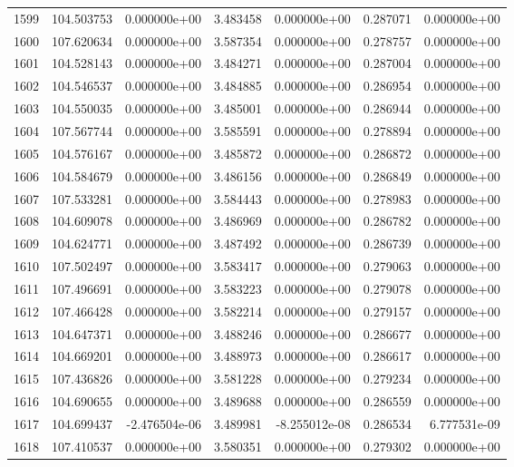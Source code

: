 \begin{tabular}{rrrrrrr}
1599 & 104.503753 &  0.000000e+00 &  3.483458 &  0.000000e+00 &    0.287071 &  0.000000e+00 \\
1600 & 107.620634 &  0.000000e+00 &  3.587354 &  0.000000e+00 &    0.278757 &  0.000000e+00 \\
1601 & 104.528143 &  0.000000e+00 &  3.484271 &  0.000000e+00 &    0.287004 &  0.000000e+00 \\
1602 & 104.546537 &  0.000000e+00 &  3.484885 &  0.000000e+00 &    0.286954 &  0.000000e+00 \\
1603 & 104.550035 &  0.000000e+00 &  3.485001 &  0.000000e+00 &    0.286944 &  0.000000e+00 \\
1604 & 107.567744 &  0.000000e+00 &  3.585591 &  0.000000e+00 &    0.278894 &  0.000000e+00 \\
1605 & 104.576167 &  0.000000e+00 &  3.485872 &  0.000000e+00 &    0.286872 &  0.000000e+00 \\
1606 & 104.584679 &  0.000000e+00 &  3.486156 &  0.000000e+00 &    0.286849 &  0.000000e+00 \\
1607 & 107.533281 &  0.000000e+00 &  3.584443 &  0.000000e+00 &    0.278983 &  0.000000e+00 \\
1608 & 104.609078 &  0.000000e+00 &  3.486969 &  0.000000e+00 &    0.286782 &  0.000000e+00 \\
1609 & 104.624771 &  0.000000e+00 &  3.487492 &  0.000000e+00 &    0.286739 &  0.000000e+00 \\
1610 & 107.502497 &  0.000000e+00 &  3.583417 &  0.000000e+00 &    0.279063 &  0.000000e+00 \\
1611 & 107.496691 &  0.000000e+00 &  3.583223 &  0.000000e+00 &    0.279078 &  0.000000e+00 \\
1612 & 107.466428 &  0.000000e+00 &  3.582214 &  0.000000e+00 &    0.279157 &  0.000000e+00 \\
1613 & 104.647371 &  0.000000e+00 &  3.488246 &  0.000000e+00 &    0.286677 &  0.000000e+00 \\
1614 & 104.669201 &  0.000000e+00 &  3.488973 &  0.000000e+00 &    0.286617 &  0.000000e+00 \\
1615 & 107.436826 &  0.000000e+00 &  3.581228 &  0.000000e+00 &    0.279234 &  0.000000e+00 \\
1616 & 104.690655 &  0.000000e+00 &  3.489688 &  0.000000e+00 &    0.286559 &  0.000000e+00 \\
1617 & 104.699437 & -2.476504e-06 &  3.489981 & -8.255012e-08 &    0.286534 &  6.777531e-09 \\
1618 & 107.410537 &  0.000000e+00 &  3.580351 &  0.000000e+00 &    0.279302 &  0.000000e+00 \\

\end{tabular}
